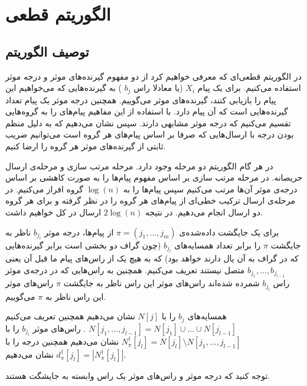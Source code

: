 \section{
	الگوریتم قطعی
	}
	\subsection{
	توصیف الگوریتم
	}

در الگوریتم قطعی‌ای که معرفی خواهیم کرد از دو مفهوم گیرنده‌های موثر و درجه موثر استفاده می‌کنیم. برای یک پیام
$X_i$
(یا معادلا راس
$b_j$
)
به گیرنده‌هایی که می‌خواهیم این پیام را بازیابی کنند، گیرنده‌های موثر می‌گوییم. همچنین درجه موثر یک پیام تعداد گیرنده‌هایی است که آن پیام دارد. با استفاده از این مفاهیم پیام‌های را به گروه‌هایی تقسیم می‌کنیم که درجه موثر مشابهی دارند. سپس نشان می‌دهیم که به دلیل منظم بودن درجه با ارسال‌هایی که صرفا بر اساس پیام‌های هر گروه است می‌توانیم ضریب ثابتی از گیرنده‌های موثر هر گروه را ارضا کنیم.

در هر گام الگوریتم
دو مرحله وجود دارد. مرحله مرتب سازی و مرحله‌ی ارسال حریصانه. در مرحله مرتب سازی بر اساس مفهوم پیام‌ها را به صورت کاهشی بر اساس درجه‌ی موثر آن‌ها مرتب می‌کنیم سپس پیام‌ها را به 
$\log(n)$
گروه افراز می‌کنیم. در مرحله‌ی ارسال ترکیب خطی‌ای از پیام‌های هر گروه را در نظر گرفته و برای هر گروه دو ارسال انجام می‌دهیم. در نتیجه
$2 \log(n)$
ارسال در کل خواهیم داشت.

\begin{definition}
	برای یک جایگشت داده‌شده‌ی 
	$\pi = (j_1, \ldots, j_m)$
	از پیام‌ها، درجه موثر
	$b_{j_l}$
	ناظر به جایگشت 
	$\pi$
	را برابر تعداد همسایه‌های 
	$b_{j_l}$
	(چون گراف دو بخشی است برابر گیرنده‌هایی که در گراف به آن یال دارند خواهد بود)	که به هیچ یک از راس‌‌های پیام ما قبل آن یعنی
	$b_{j_1}, \ldots, b_{j_{l - 1}}$
	متصل نیستند تعریف می‌کنیم. همچنین به راس‌هایی که در درجه‌ی موثر راس
		$b_{j_l}$
		شمرده شده‌اند راس‌های موثر این راس ناظر به جایگشت
		$\pi$
		راس‌های موثر این راس ناظر به
		$\pi$
		 می‌گوییم.
		 
		 همسایه‌های
		 $b_j$
		 را با
		 $N[j]$
		 نشان می‌دهیم همچنین تعریف می‌کنیم
		 $N[j_1, \ldots, j_{l - 1}] = N[j_1] \cup \ldots \cup N[j_{l - 1}]$
		 . راس‌های موثر
 		$b_{j_l}$
 		را با
 		$N^\dagger_\pi [j_l] = N[j_l] \setminus N[j_1, \ldots, j_{l - 1}]$
 		نشان می‌دهیم همچنین درجه را با
 		$d^\dagger_\pi[j_l] = |N^\dagger_\pi [j_l] |$
 		نشان می‌دهیم.
\end{definition}

توجه کنید که درجه موثر و راس‌های موثر یک راس وابسته به جایشگت هستند.

